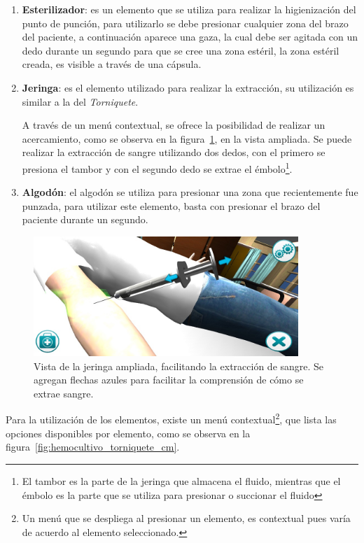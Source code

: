 \begin{itemize}
\begin{enumerate}
\item \textbf{Esterilizador}: es un elemento que se utiliza para realizar la
    higienización del punto de punción, para utilizarlo se debe presionar
    cualquier zona del brazo del paciente, a continuación aparece una gaza, la
    cual debe ser agitada con un dedo durante un segundo para que se cree una
    zona estéril, la zona estéril creada, es visible a través de una cápsula.

\item \textbf{Jeringa}: es el elemento utilizado para realizar la extracción, su
    utilización es similar a la del \emph{Torniquete}.

    A través de un menú contextual, se ofrece la posibilidad de realizar un
    acercamiento, como se observa en la
    figura~\ref{fig:hemocultivo_jeringa_zoom}, en la vista ampliada. Se puede
    realizar la extracción de sangre utilizando dos dedos, con el primero se
    presiona el tambor y con el segundo dedo se extrae el émbolo\footnote{El
        tambor es la parte de la jeringa que almacena el fluido, mientras que el
        émbolo es la parte que se utiliza para presionar o succionar el fluido}.
    
\item \textbf{Algodón}: el algodón se utiliza para presionar una zona que
    recientemente fue punzada, para utilizar este elemento, basta con presionar
    el brazo del paciente durante un segundo.

\end{enumerate}

\begin{figure}[H]
\centering 
\includegraphics[width=10cm]{solucion/images/hemocultivo_jeringa_ampliada.jpg}
\caption{Vista de la jeringa ampliada, facilitando la extracción de sangre. Se
    agregan flechas azules para facilitar la comprensión de cómo se extrae
    sangre.}
\label{fig:hemocultivo_jeringa_zoom}
\end{figure}


Para la utilización de los elementos, existe un menú contextual\footnote{Un menú
    que se despliega al presionar un elemento, es contextual pues varía de
    acuerdo al elemento seleccionado.}, que lista las opciones disponibles por
elemento, como se observa en la figura~\ref{fig:hemocultivo_torniquete_cm}.


\end{itemize}
